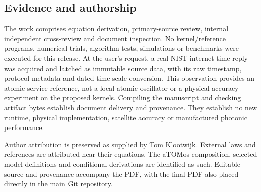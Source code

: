 \subsection*{Evidence and authorship}
The work comprises equation derivation, primary-source review, internal
independent cross-review and document inspection. No kernel/reference programs,
numerical trials, algorithm tests, simulations or benchmarks
were executed for this release. At the user's request, a real NIST internet
time reply was acquired and latched as immutable source data, with its raw
timestamp, protocol metadata and dated time-scale conversion. This observation
provides an atomic-service reference, not a local atomic oscillator or a
physical accuracy experiment on the proposed kernels. Compiling the manuscript and checking artifact
bytes establish document delivery and provenance. They establish no new runtime,
physical implementation, satellite accuracy or manufactured photonic performance.

Author attribution is preserved as supplied by Tom Klootwijk. External laws
and references are attributed near their equations. The aTOMos composition,
selected model definitions and conditional derivations are identified as such.
Editable source and provenance accompany the PDF, with the final PDF also
placed directly in the main Git repository.
\clearpage
